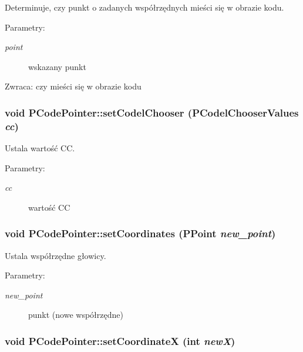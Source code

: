 Determinuje, czy punkt o zadanych współrzędnych mieści się w obrazie kodu. \begin{Desc}
\item[Parametry:]
\begin{description}
\item[{\em point}]wskazany punkt \end{description}
\end{Desc}
\begin{Desc}
\item[Zwraca:]czy mieści się w obrazie kodu \end{Desc}
\hypertarget{classPCodePointer_b5c13bf294dddd672ca9fe7675eb258b}{
\subsubsection[{setCodelChooser}]{\setlength{\rightskip}{0pt plus 5cm}void PCodePointer::setCodelChooser ({\bf PCodelChooserValues} {\em cc})}}
\label{classPCodePointer_b5c13bf294dddd672ca9fe7675eb258b}


Ustala wartość CC. \begin{Desc}
\item[Parametry:]
\begin{description}
\item[{\em cc}]wartość CC \end{description}
\end{Desc}
\hypertarget{classPCodePointer_117bf9322b4fdcb189c41a6f2f113a4b}{
\subsubsection[{setCoordinates}]{\setlength{\rightskip}{0pt plus 5cm}void PCodePointer::setCoordinates ({\bf PPoint} {\em new\_\-point})}}
\label{classPCodePointer_117bf9322b4fdcb189c41a6f2f113a4b}


Ustala współrzędne głowicy. \begin{Desc}
\item[Parametry:]
\begin{description}
\item[{\em new\_\-point}]punkt (nowe współrzędne) \end{description}
\end{Desc}
\hypertarget{classPCodePointer_9bcf58c97f704e3be2deefb588f91312}{
\subsubsection[{setCoordinateX}]{\setlength{\rightskip}{0pt plus 5cm}void PCodePointer::setCoordinateX (int {\em newX})}}
\label{classPCodePointer_9bcf58c97f704e3be2deefb588f91312}


